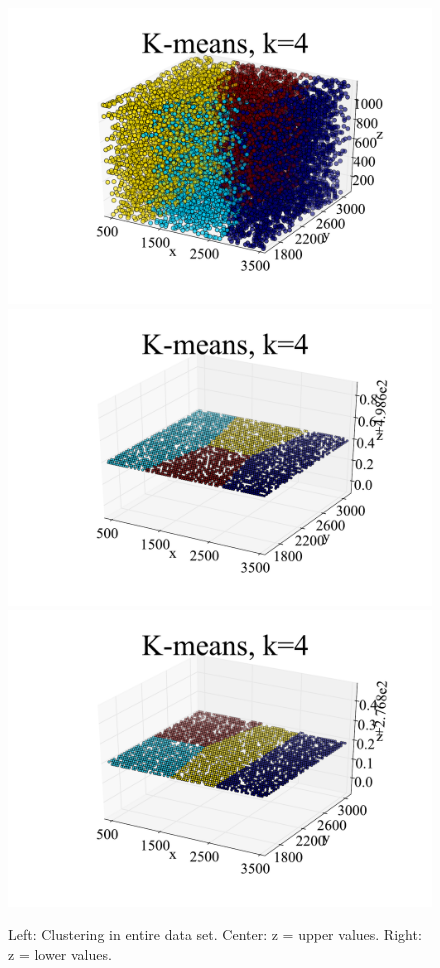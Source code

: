 \documentclass{article}
\begin{document}
\begin{figure}[h]
  \centering
  \includegraphics[scale=.15]{Fig13a}
  \includegraphics[scale=.15]{Fig13b}
  \includegraphics[scale=.15]{Fig13c}
  \caption{Left: Clustering in entire data set. Center: z = upper values. Right: z = lower values.}
\end{figure}
\end{document}
